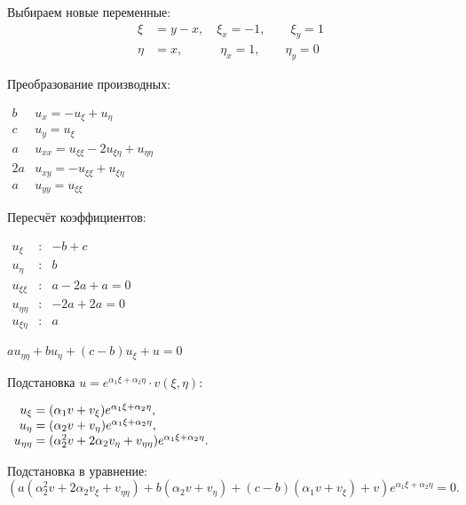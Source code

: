 \documentclass[a4paper,12pt]{article}
\begin{document}
Выбираем новые переменные:
\begin{align*}
    \xi &= y - x,   \quad \xi_x = -1, \quad \quad \xi_y = 1 \\
    \eta &= x, \quad \quad \quad \eta_x = 1, \quad \quad \eta_y = 0
\end{align*}

Преобразование производных:
\begin{flushleft}
\(
\begin{array}{r|l}
b & u_x = - u_{\xi} + u_{\eta} \\
c & u_y = u_{\xi} \\
a & u_{xx} = u_{\xi\xi} - 2 u_{\xi\eta} + u_{\eta\eta} \\
2a & u_{xy} = - u_{\xi\xi} + u_{\xi\eta} \\
a & u_{yy} = u_{\xi\xi}
\end{array}
\)
\end{flushleft}

Пересчёт коэффициентов:
\begin{flushleft}
\(
\begin{array}{rcl}
    u_{\xi} &:& -b + c \\
    u_{\eta} &:& b \\
    u_{\xi\xi} &:& a - 2a + a = 0 \\
    u_{\eta\eta} &:& -2a + 2a = 0 \\
    u_{\xi\eta} &:& a
\end{array}
\)
\end{flushleft}

$ au_{\eta\eta} + bu_{\eta} + (c-b)u_{\xi}+u=0$

\vspace{2mm}
Подстановка $ u = e^{\alpha_1 \xi + \alpha_2 \eta} \cdot v(\xi, \eta) $:
\begin{flushleft}
\(
\begin{array}{r@{}l}
    u_{\xi} &{}= (\alpha_1 v + v_{\xi}) e^{\alpha_1 \xi + \alpha_2 \eta}, \\
    u_{\eta} &{}= (\alpha_2 v + v_{\eta}) e^{\alpha_1 \xi + \alpha_2 \eta}, \\
    u_{\eta\eta} &{}= (\alpha_2^2 v + 2\alpha_2 v_{\eta} + v_{\eta\eta}) e^{\alpha_1 \xi + \alpha_2 \eta}.
\end{array}
\)
\end{flushleft}

Подстановка в уравнение:
\begin{equation*}
    (a(\alpha_2^2 v + 2\alpha_2 v_{\xi} + v_{\eta\eta}) + b (\alpha_2 v + v_{\eta}) + (c - b)(\alpha_1 v + v_{\xi}) + v) e^{\alpha_1 \xi + \alpha_2 \eta}= 0.
\end{equation*}
\end{document}
